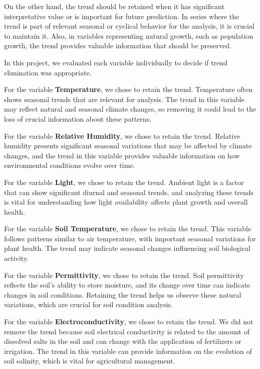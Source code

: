 On the other hand, the trend should be retained when it has significant interpretative value or is important for future prediction. In series where the trend is part of relevant seasonal or cyclical behavior for the analysis, it is crucial to maintain it. Also, in variables representing natural growth, such as population growth, the trend provides valuable information that should be preserved.

In this project, we evaluated each variable individually to decide if trend elimination was appropriate.

For the variable \textbf{Temperature}, we chose to retain the trend. Temperature often shows seasonal trends that are relevant for analysis. The trend in this variable may reflect natural and seasonal climate changes, so removing it could lead to the loss of crucial information about these patterns.

For the variable \textbf{Relative Humidity}, we chose to retain the trend. Relative humidity presents significant seasonal variations that may be affected by climate changes, and the trend in this variable provides valuable information on how environmental conditions evolve over time.

For the variable \textbf{Light}, we chose to retain the trend. Ambient light is a factor that can show significant diurnal and seasonal trends, and analyzing these trends is vital for understanding how light availability affects plant growth and overall health.

For the variable \textbf{Soil Temperature}, we chose to retain the trend. This variable follows patterns similar to air temperature, with important seasonal variations for plant health. The trend may indicate seasonal changes influencing soil biological activity.

For the variable \textbf{Permittivity}, we chose to retain the trend. Soil permittivity reflects the soil's ability to store moisture, and its change over time can indicate changes in soil conditions. Retaining the trend helps us observe these natural variations, which are crucial for soil condition analysis.

For the variable \textbf{Electroconductivity}, we chose to retain the trend. We did not remove the trend because soil electrical conductivity is related to the amount of dissolved salts in the soil and can change with the application of fertilizers or irrigation. The trend in this variable can provide information on the evolution of soil salinity, which is vital for agricultural management.

